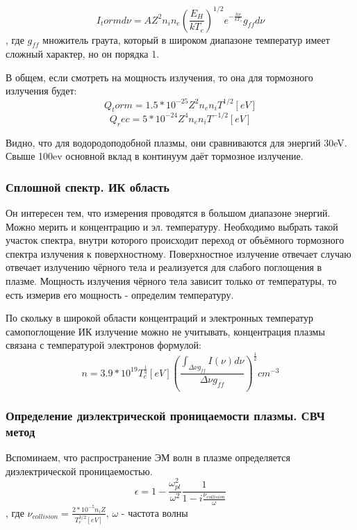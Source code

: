 \documentclass[10pt, a4paper]{article}
\begin{document}
\begin{equation}
	I_torm d\nu = A Z^{2} n_i n_e (\frac{E_H}{kT_e})^{1/2} e^{-\frac{h \nu}{kT_e}} g_{ff} d\nu
\end{equation}
, где $g_{ff}$ множитель граута, который в широком диапазоне температур имеет сложный характер, но он порядка 1.

В общем, если смотреть на мощность излучения, то она для тормозного излучения будет:
\begin{equation}
	Q_torm=1.5 *10^{-25} Z^{2} n_e n_i T^{1/2}[eV]
\end{equation}
\begin{equation}
	Q_rec=5 *10^{-24} Z^{4} n_e n_i T^{-1/2}[eV]
\end{equation}

Видно, что для водородоподобной плазмы, они сравниваются для энергий 30eV. Свыше 100ev основной вклад в континуум даёт тормозное излучение.

\subsubsection{Сплошной спектр. ИК область}
\label{11.2.5}

Он интересен тем, что измерения проводятся в большом диапазоне энергий. Можно мерить и концентрацию и эл. температуру.
Необходимо выбрать такой участок спектра, внутри которого происходит переход от объёмного тормозного спектра излучения к поверхностному.
Поверхностное излучение отвечает случаю отвечает излучению чёрного тела и реализуется для слабого поглощения в плазме. Мощность излучения чёрного тела зависит только от температуры, то есть измерив его мощность - определим температуру.

По скольку в широкой области концентраций и электронных температур самопоглощение ИК излучение можно не учитывать, концентрация плазмы связана с температурой электронов формулой:
\begin{equation}
	n=3.9*10^{19} T_e^{\frac{1}{4}}[eV] (\frac{\int_{\Delta \nu g_{ff}} I(\nu) d\nu}{\Delta \nu g_{ff}})^{\frac{1}{2}}   cm^{-3}
\end{equation}

\subsubsection{Определение диэлектрической проницаемости плазмы. СВЧ метод}
\label{11.4}

Вспоминаем, что распространение ЭМ волн в плазме определяется диэлектрической проницаемостью.
\begin{equation}
	\epsilon = 1- \frac{\omega_{pl}^{2}}{\omega^{2}} \frac{1}{1-i \frac{\nu_{collision}}{\omega}}
\end{equation} 
, где $\nu_{collision}=\frac{2*10^{-5} n_i Z}{T_e^{3/2}[eV]}$, $\omega$ - частота волны
\end{document}
